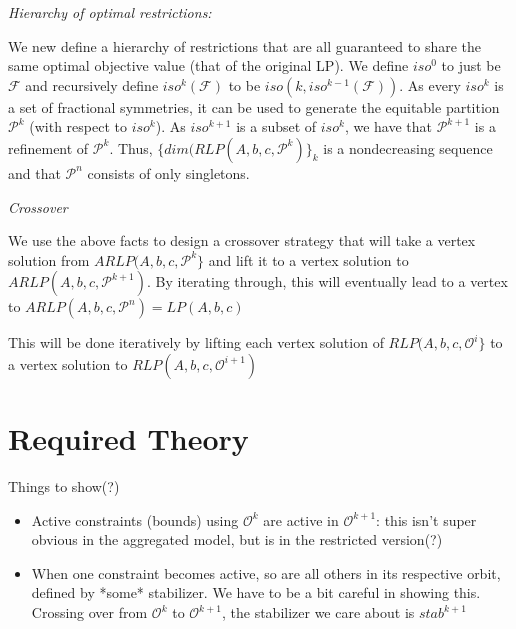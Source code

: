 \documentclass[runningheads]{llncs}
\newcommand{\cP}{{\mathcal P}}
\newcommand{\cF}{{\mathcal F}}
\newcommand{\cO}{{\mathcal O}}
\begin{document}
{\em Hierarchy of  optimal restrictions:}

We new define a hierarchy of restrictions that are all guaranteed to share the
same optimal objective value (that of the original LP). We define $iso^0$ to just be $\cF$ and recursively define $iso^k(\cF)$
to be $iso( k , iso^{k-1}(\cF))$. As every $iso^k$ is a set of fractional symmetries, it can be used
to generate the equitable partition $\cP^k$ (with respect to $iso^k$). As $iso^{k+1}$
is a subset of $iso^k$, we have that $\cP^{k+1}$ is a refinement of $\cP^k$.
Thus, $\{dim(RLP(A,b,c,\cP^k)\}_{ k }$ is a nondecreasing
sequence and that $\cP^n$ consists of only singletons.



{\em Crossover}

We use the above facts to design a crossover strategy that will take a vertex
solution from $ARLP(A,b,c,\cP^k\}$ and  lift it to a vertex solution to
$ARLP(A,b,c,\cP^{k+1})$. By iterating through, this will eventually lead to a vertex to $ARLP(A,b,c,\cP^{n}) = LP(A,b,c)$







This will be done iteratively by lifting each
vertex solution of  $RLP(A,b,c,\cO^i\}$  to a vertex solution to
$RLP(A,b,c,\cO^{i+1})$ 



\section{Required Theory}

Things to show(?)
\begin{itemize}
\item Active constraints (bounds) using $\cO^k$ are active in $\cO^{k+1}$: this isn't
  super obvious in the aggregated model, but is in the restricted version(?)
  \item When one constraint becomes active, so are all others in its respective
    orbit, defined by *some* stabilizer. We have to be a bit careful in showing
    this. Crossing over  from $\cO^k$ to $\cO^{k+1}$, the stabilizer we care
    about is $stab^{k+1}$

    \end{itemize}
\end{document}
